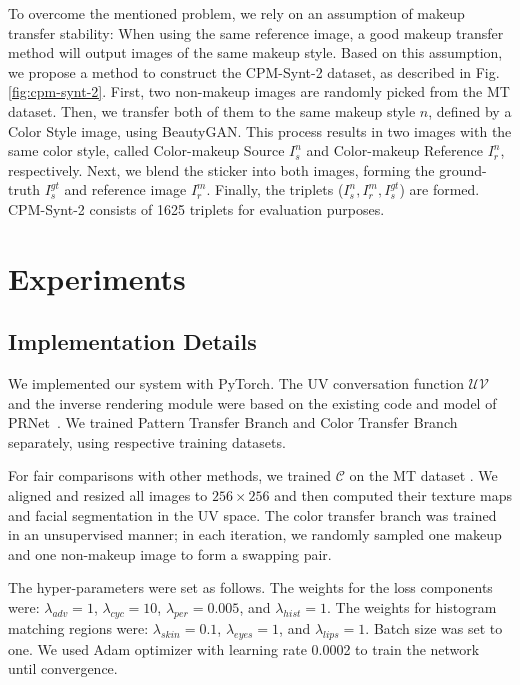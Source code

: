 \documentclass[final]{cvpr}
\begin{document}
To overcome the mentioned problem, we rely on an assumption of makeup transfer stability: When using the same reference image, a good makeup transfer method will output images of the same makeup style. Based on this assumption, we propose a method to construct the CPM-Synt-2 dataset, as described in Fig. \ref{fig:cpm-synt-2}. First, two non-makeup images are randomly picked from the MT dataset. Then, we transfer both of them to the same makeup style $n$, defined by a Color Style image, using BeautyGAN. This process results in two images with the same color style, called Color-makeup Source $I_s^n$ and Color-makeup Reference $I_r^n$, respectively. Next, we blend the sticker into both images, forming the ground-truth $I_s^{gt}$ and reference image $I_r^m$. Finally, the triplets ($I_s^n, I_r^m, I_s^{gt}$) are formed. \mbox{CPM-Synt-2} consists of 1625 triplets for evaluation purposes.





\section{Experiments}
\subsection{Implementation Details}
We implemented our system with PyTorch. The UV conversation function $\mathcal{UV}$ and the inverse rendering module were based on the existing code and model of PRNet~\cite{feng2018prn}. We trained Pattern Transfer Branch and Color Transfer Branch separately, using respective training datasets.

 For fair comparisons with other methods, we trained $\mathcal{C}$ on the MT dataset \cite{beautygan}. We aligned and resized all images to $256{\times}256$ and then computed their texture maps and facial segmentation in the UV space. The color transfer branch was trained in an unsupervised manner; in each iteration, we randomly sampled one makeup and one non-makeup image to form a swapping pair.

The hyper-parameters were set as follows. The weights for the loss components were: $\lambda_{adv}{=}1$, $\lambda_{cyc}{=}10$, $\lambda_{per}{=}0.005$, and $\lambda_{hist}{=}1$. The weights for histogram matching regions were: $\lambda_{skin}{=}0.1$, $\lambda_{eyes}{=}1$, and $\lambda_{lips}{=}1$. Batch size was set to one. We used Adam optimizer with learning rate 0.0002 to train the network until convergence.
\end{document}
